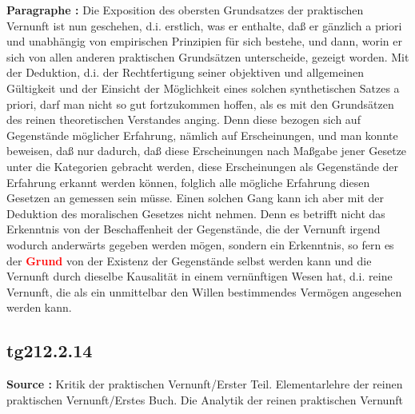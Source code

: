 \documentclass[a4paper,12pt,twoside]{book}
\newcommand{\match}[1]{\textcolor{red}{\textbf{#1}}}
\begin{document}
	\noindent\textbf{Paragraphe : }Die Exposition des obersten Grundsatzes der praktischen Vernunft ist nun geschehen, d.i. erstlich, was er enthalte, daß er gänzlich a priori und unabhängig von empirischen Prinzipien für sich bestehe, und dann, worin er sich von allen anderen praktischen Grundsätzen unterscheide, gezeigt worden. Mit der Deduktion, d.i. der Rechtfertigung seiner objektiven und allgemeinen Gültigkeit und der Einsicht der Möglichkeit eines solchen synthetischen Satzes a priori, darf man nicht so gut fortzukommen hoffen, als es mit den Grundsätzen des reinen theoretischen Verstandes anging. Denn diese bezogen sich auf Gegenstände möglicher Erfahrung, nämlich auf Erscheinungen, und man konnte beweisen, daß nur dadurch, daß diese Erscheinungen nach Maßgabe jener Gesetze unter die Kategorien gebracht werden, diese Erscheinungen als Gegenstände der Erfahrung erkannt werden können, folglich alle mögliche Erfahrung diesen Gesetzen an gemessen sein müsse. Einen solchen  Gang kann ich aber mit der Deduktion des moralischen Gesetzes nicht nehmen. Denn es betrifft nicht das Erkenntnis von der Beschaffenheit der Gegenstände, die der Vernunft irgend wodurch anderwärts gegeben werden mögen, sondern ein Erkenntnis, so fern es der \match{Grund} von der Existenz der Gegenstände selbst werden kann und die Vernunft durch dieselbe Kausalität in einem vernünftigen Wesen hat, d.i. reine Vernunft, die als ein unmittelbar den Willen bestimmendes Vermögen angesehen werden kann. 
	
	\subsection*{tg212.2.14} 
	\textbf{Source : }Kritik der praktischen Vernunft/Erster Teil. Elementarlehre der reinen praktischen Vernunft/Erstes Buch. Die Analytik der reinen praktischen Vernunft\\  
	
\end{document}
